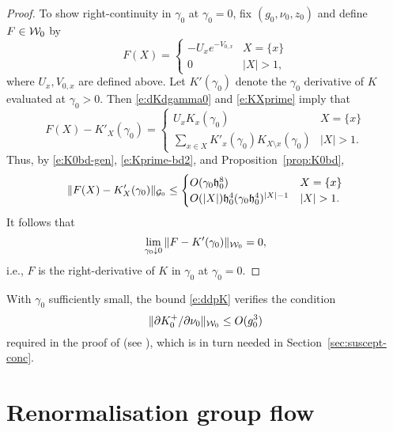 \begin{proof}
To show right-continuity in $\gamma_0$ at $\gamma_0 = 0$,
fix $(g_0, \nu_0, z_0)$ and define $F \in \mathcal{W}_0$ by
\begin{equation}
F(X) =
\begin{cases}
  -U_x e^{-V_{0,x}}
    & X = \{ x \} \\
  0 & |X| > 1,
\end{cases}
\end{equation}
where $U_x, V_{0,x}$ are defined above.
Let $K'(\gamma_0)$ denote the $\gamma_0$ derivative of $K$ evaluated at $\gamma_0 > 0$.  Then
\eqref{e:dKdgamma0} and \eqref{e:KXprime} imply that
\begin{equation}
F(X) - K'_X(\gamma_0)
  =
\begin{cases}
  U_x K_x(\gamma_0)
    & X = \{ x \} \\
  \sum_{x \in X} K'_x(\gamma_0) K_{X \setminus x}(\gamma_0)
    & |X| > 1.
\end{cases}
\end{equation}
Thus, by \eqref{e:K0bd-gen}, \eqref{e:Kprime-bd2}, and Proposition~\ref{prop:K0bd},
\begin{equation}
\|F(X) - K'_X(\gamma_0)\|_{\mathcal{G}_0}
  \le
\begin{cases}
  O(\gamma_0 \mathfrak{h}_0^8)
    & X = \{ x \} \\
  O(|X|) \mathfrak{h}_0^4 (\gamma_0 \mathfrak{h}_0^4)^{|X|-1}
    & |X| > 1.
\end{cases}
\end{equation}
It follows that
\begin{equation}
\lim_{\gamma_0\downarrow 0} \|F - K'(\gamma_0)\|_{\mathcal{W}_0} = 0,
\end{equation}
i.e., $F$ is the right-derivative of $K$ in $\gamma_0$ at $\gamma_0 = 0$.
\end{proof}

\begin{rk}
\label{rk:DK-base-case}
With $\gamma_0$ sufficiently small, the bound \eqref{e:ddpK} verifies the condition
\begin{equation}
\|\partial K^+_0/\partial\nu_0\|_{\mathcal{W}_0} \le O(g_0^3)
\end{equation}
required in the proof of \cite[Lemma~\ref{log-lem:gzmuprime}]{BBS-saw4-log}
(see \cite[\eqref{log-e:induct1}]{BBS-saw4-log}),
which is in turn needed in Section~\ref{sec:suscept-conc}.
\end{rk}

\section{Renormalisation group flow}
\label{sec:flow}

